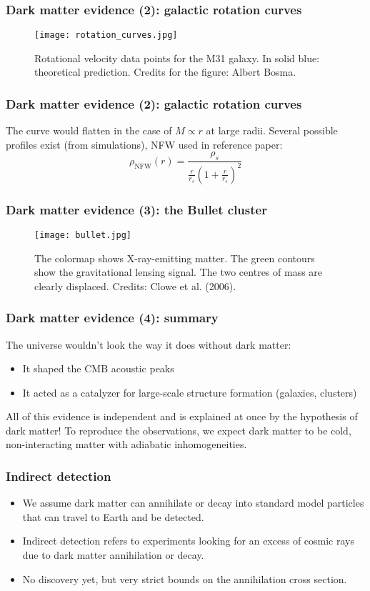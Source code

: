 \documentclass{beamer}
\begin{document}
\begin{frame}
\frametitle{Dark matter evidence (2): galactic rotation curves}
\begin{figure}[htbp]
	\centering
	\texttt{[image: rotation\_curves.jpg]}
	\caption{Rotational velocity data points for the M31 galaxy. In solid blue: theoretical prediction. Credits for the figure: Albert Bosma.}
	\label{fig:rotation_curves}
\end{figure}
\end{frame}

\begin{frame}
\frametitle{Dark matter evidence (2): galactic rotation curves}
The curve would flatten in the case of \(M \propto r\) at large radii. Several possible profiles exist (from simulations), NFW used in reference paper:
\[
	\rho_{\mathrm{NFW} } (r) = \frac{\rho _s}{\frac{r}{r_s} \left( 1+ \frac{r}{r_s} \right) ^2}
\]
\end{frame}

\begin{frame}
\frametitle{Dark matter evidence (3): the Bullet cluster}
\begin{figure}[htbp]
	\centering
	\texttt{[image: bullet.jpg]}
	\caption{The colormap shows X-ray-emitting matter. The green contours show the gravitational lensing signal. The two centres of mass are clearly displaced. Credits: Clowe et al. (2006).}
	\label{fig:bullet}
\end{figure}
\end{frame}

\begin{frame}
\frametitle{Dark matter evidence (4): summary}
The universe wouldn't look the way it does without dark matter:
\begin{itemize}
	\item It shaped the CMB acoustic peaks
	\item It acted as a catalyzer for large-scale structure formation (galaxies, clusters)
\end{itemize}
\pause
All of this evidence is independent and is explained at once by the hypothesis of dark matter!
\pause
To reproduce the observations, we expect dark matter to be cold, non-interacting matter with adiabatic inhomogeneities.
\end{frame}

\begin{frame}
\frametitle{Indirect detection}
\begin{itemize}
	\item We assume dark matter can annihilate or decay into standard model particles that can travel to Earth and be detected.
	\item Indirect detection refers to experiments looking for an excess of cosmic rays due to dark matter annihilation or decay.
	\item No discovery yet, but very strict bounds on the annihilation cross section.
\end{itemize}
\end{frame}
\end{document}
